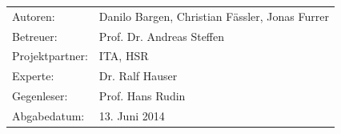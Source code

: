 \begin{titlepage}
\vspace{80pt}
 
 
\begin{minipage}[b]{0.4\textwidth}
\begin{flushleft}
\begin{tabular}{ll}  
Autoren: & Danilo Bargen, Christian Fässler, Jonas Furrer \\ 
Betreuer: & Prof. Dr. Andreas Steffen\\ 
Projektpartner: & ITA, HSR\\
Experte: & Dr. Ralf Hauser\\
Gegenleser: & Prof. Hans Rudin\\
Abgabedatum: & 13. Juni 2014\\
\end{tabular}
\end{flushleft}
\end{minipage}

 
\end{titlepage}

\tableofcontents\newpage
